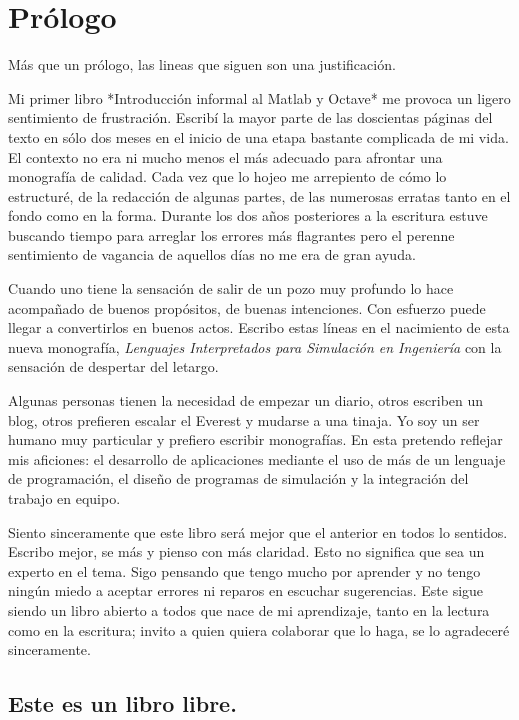 \chapter*{Prólogo}

Más que un prólogo, las lineas que siguen son una justificación.  

Mi primer libro *Introducción informal al Matlab y Octave* me provoca
un ligero sentimiento de frustración.  Escribí la mayor parte de las
doscientas páginas del texto en sólo dos meses en el inicio de una
etapa bastante complicada de mi vida.  El contexto no era ni mucho
menos el más adecuado para afrontar una monografía de calidad.  Cada
vez que lo hojeo me arrepiento de cómo lo estructuré, de la redacción
de algunas partes, de las numerosas erratas tanto en el fondo como en
la forma. Durante los dos años posteriores a la escritura estuve
buscando tiempo para arreglar los errores más flagrantes pero el
perenne sentimiento de vagancia de aquellos días no me era de gran
ayuda.

Cuando uno tiene la sensación de salir de un pozo muy profundo lo hace
acompañado de buenos propósitos, de buenas intenciones.  Con esfuerzo
puede llegar a convertirlos en buenos actos.  Escribo estas líneas en
el nacimiento de esta nueva monografía, \emph{Lenguajes Interpretados
  para Simulación en Ingeniería} con la sensación de despertar del
letargo.

Algunas personas tienen la necesidad de empezar un diario, otros
escriben un blog, otros prefieren escalar el Everest y mudarse a una
tinaja.  Yo soy un ser humano muy particular y prefiero escribir
monografías. En esta pretendo reflejar mis aficiones: el desarrollo de
aplicaciones mediante el uso de más de un lenguaje de programación, el
diseño de programas de simulación y la integración del trabajo en
equipo.

Siento sinceramente que este libro será mejor que el anterior en todos
lo sentidos.  Escribo mejor, se más y pienso con más claridad.  Esto
no significa que sea un experto en el tema.  Sigo pensando que tengo
mucho por aprender y no tengo ningún miedo a aceptar errores ni
reparos en escuchar sugerencias.  Este sigue siendo un libro abierto a
todos que nace de mi aprendizaje, tanto en la lectura como en la
escritura; invito a quien quiera colaborar que lo haga, se lo
agradeceré sinceramente.


\section*{Este es un libro libre.}
  
